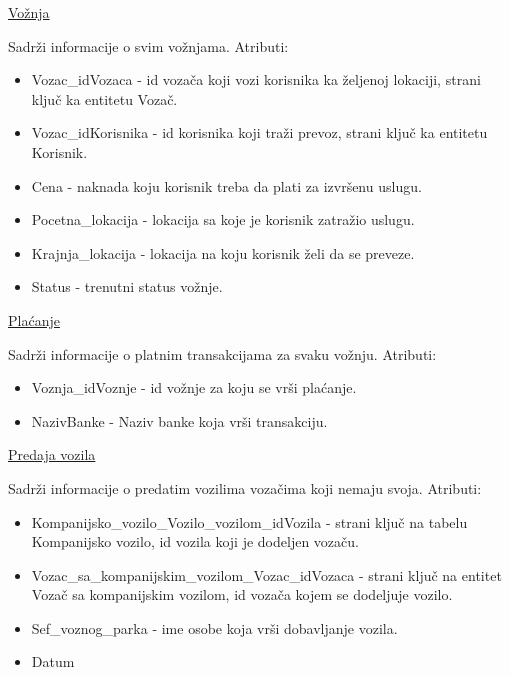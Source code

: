 \begin{flushleft}
\underline{Vožnja}
\end{flushleft}
Sadrži informacije o svim vožnjama. Atributi:
\begin{itemize}
    \item Vozac\_idVozaca - id vozača koji vozi korisnika ka željenoj lokaciji, strani ključ ka entitetu Vozač.
    \item Vozac\_idKorisnika - id korisnika koji traži prevoz, strani ključ ka entitetu Korisnik.
    \item Cena - naknada koju korisnik treba da plati za izvršenu uslugu.
    \item Pocetna\_lokacija - lokacija sa koje je korisnik zatražio uslugu.
    \item Krajnja\_lokacija - lokacija na koju korisnik želi da se preveze.
    \item Status - trenutni status vožnje.
\end{itemize}

\begin{flushleft}
\underline{Plaćanje}
\end{flushleft}
Sadrži informacije o platnim transakcijama za svaku vožnju. Atributi:
\begin{itemize}
    \item Voznja\_idVoznje - id vožnje za koju se vrši plaćanje.
    \item NazivBanke - Naziv banke koja vrši transakciju.
\end{itemize}

\begin{flushleft}
\underline{Predaja vozila}
\end{flushleft}
Sadrži informacije o predatim vozilima vozačima koji nemaju svoja. Atributi:
\begin{itemize}
    \item Kompanijsko\_vozilo\_Vozilo\_vozilom\_idVozila - strani ključ na tabelu Kompanijsko vozilo, id vozila koji je dodeljen vozaču.
    \item Vozac\_sa\_kompanijskim\_vozilom\_Vozac\_idVozaca - strani ključ na entitet Vozač sa kompanijskim vozilom, id vozača kojem se dodeljuje vozilo.
    \item Sef\_voznog\_parka - ime osobe koja vrši dobavljanje vozila.
    \item Datum
\end{itemize}

